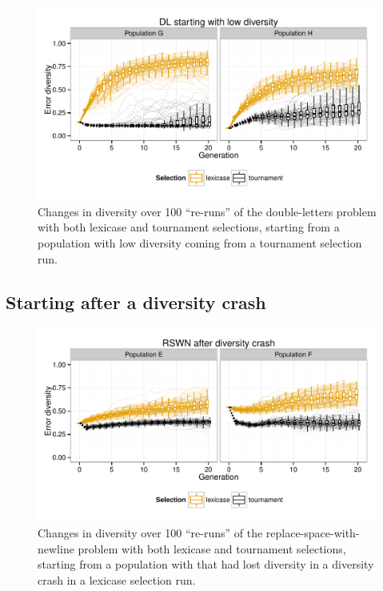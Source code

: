 \documentclass{sig-alternate-05-2015}
\begin{document}
\begin{figure}
	\includegraphics{../figures/DL_low_diversity}
	\vspace{-1 cm}
	\caption{Changes in diversity over 100 ``re-runs'' of the double-letters problem with both lexicase and tournament selections, starting from a population with low diversity coming from a tournament selection run.}
	\label{fig:DLlowDiversity}
\end{figure}

\subsection{Starting after a diversity crash}
\label{sec:crashDiversityResults}

\begin{figure}
	\includegraphics{../figures/RSWN_diversity_crash}
	\vspace{-1 cm}
	\caption{Changes in diversity over 100 ``re-runs'' of the replace-space-with-newline problem with both lexicase and tournament selections, starting from a population with that had lost diversity in a diversity crash in a lexicase selection run.}
	\label{fig:RSWNdiversityCrash}
\end{figure}
\end{document}
